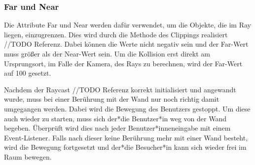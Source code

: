 \subsubsection{Far und Near}
Die Attribute Far und Near werden dafür verwendet, um die Objekte, die im Ray liegen, einzugrenzen. Dies wird durch die Methode des Clippings realisiert //TODO Referenz. Dabei können die Werte nicht negativ sein und der Far-Wert muss größer als der Near-Wert sein. Um die Kollision erst direkt am Ursprungsort, im Falle der Kamera, des Rays zu berechnen, wird der Far-Wert auf 100 gesetzt.
   	
Nachdem der Raycast //TODO Referenz korrekt initialisiert und angewandt wurde, muss bei einer Berührung mit der Wand nur noch richtig damit umgegangen werden. Dabei wird die Bewegung des Benutzers gestoppt. Um diese auch wieder zu starten, muss sich der*die Benutzer*in weg von der Wand begeben. Überprüft wird dies nach jeder Benutzer*inneneingabe mit einem Event-Listener. Falls nach dieser keine Berührung mehr mit einer Wand besteht, wird die Bewegung fortgesetzt und der*die Besucher*in kann sich wieder frei im Raum bewegen.

\newpage

